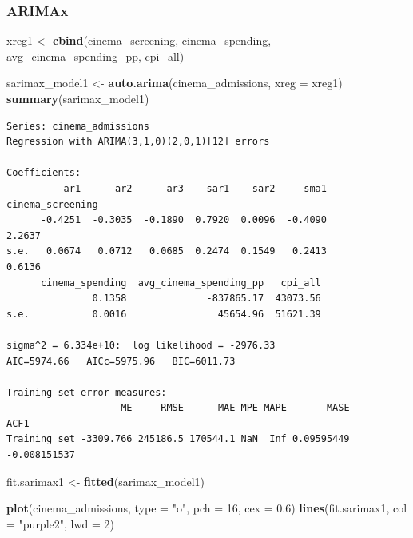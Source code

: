 \documentclass[
]{article}
\newenvironment{Shaded}{\begin{snugshade}}{\end{snugshade}}
\newcommand{\AttributeTok}[1]{\textcolor[rgb]{0.13,0.29,0.53}{#1}}
\newcommand{\DecValTok}[1]{\textcolor[rgb]{0.00,0.00,0.81}{#1}}
\newcommand{\FloatTok}[1]{\textcolor[rgb]{0.00,0.00,0.81}{#1}}
\newcommand{\FunctionTok}[1]{\textcolor[rgb]{0.13,0.29,0.53}{\textbf{#1}}}
\newcommand{\NormalTok}[1]{#1}
\newcommand{\OtherTok}[1]{\textcolor[rgb]{0.56,0.35,0.01}{#1}}
\newcommand{\StringTok}[1]{\textcolor[rgb]{0.31,0.60,0.02}{#1}}
\begin{document}
\subsubsection{ARIMAx}\label{arimax}

\begin{Shaded}
\begin{Highlighting}[]
\NormalTok{xreg1 }\OtherTok{\textless{}{-}} \FunctionTok{cbind}\NormalTok{(cinema\_screening, cinema\_spending, avg\_cinema\_spending\_pp,}
\NormalTok{    cpi\_all)}

\NormalTok{sarimax\_model1 }\OtherTok{\textless{}{-}} \FunctionTok{auto.arima}\NormalTok{(cinema\_admissions, }\AttributeTok{xreg =}\NormalTok{ xreg1)}
\FunctionTok{summary}\NormalTok{(sarimax\_model1)}
\end{Highlighting}
\end{Shaded}

\begin{verbatim}
Series: cinema_admissions 
Regression with ARIMA(3,1,0)(2,0,1)[12] errors 

Coefficients:
          ar1      ar2      ar3    sar1    sar2     sma1  cinema_screening
      -0.4251  -0.3035  -0.1890  0.7920  0.0096  -0.4090            2.2637
s.e.   0.0674   0.0712   0.0685  0.2474  0.1549   0.2413            0.6136
      cinema_spending  avg_cinema_spending_pp   cpi_all
               0.1358              -837865.17  43073.56
s.e.           0.0016                45654.96  51621.39

sigma^2 = 6.334e+10:  log likelihood = -2976.33
AIC=5974.66   AICc=5975.96   BIC=6011.73

Training set error measures:
                    ME     RMSE      MAE MPE MAPE       MASE         ACF1
Training set -3309.766 245186.5 170544.1 NaN  Inf 0.09595449 -0.008151537
\end{verbatim}

\begin{Shaded}
\begin{Highlighting}[]
\NormalTok{fit.sarimax1 }\OtherTok{\textless{}{-}} \FunctionTok{fitted}\NormalTok{(sarimax\_model1)}

\FunctionTok{plot}\NormalTok{(cinema\_admissions, }\AttributeTok{type =} \StringTok{"o"}\NormalTok{, }\AttributeTok{pch =} \DecValTok{16}\NormalTok{, }\AttributeTok{cex =} \FloatTok{0.6}\NormalTok{)}
\FunctionTok{lines}\NormalTok{(fit.sarimax1, }\AttributeTok{col =} \StringTok{"purple2"}\NormalTok{, }\AttributeTok{lwd =} \DecValTok{2}\NormalTok{)}
\end{Highlighting}
\end{Shaded}
\end{document}
